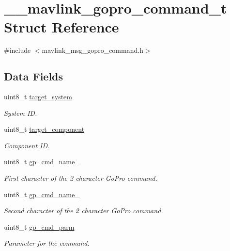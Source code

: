 \hypertarget{struct____mavlink__gopro__command__t}{\section{\+\_\+\+\_\+mavlink\+\_\+gopro\+\_\+command\+\_\+t Struct Reference}
\label{struct____mavlink__gopro__command__t}
}


{\ttfamily \#include $<$mavlink\+\_\+msg\+\_\+gopro\+\_\+command.\+h$>$}

\subsection*{Data Fields}
\begin{DoxyCompactItemize}
\item 
uint8\+\_\+t \hyperlink{struct____mavlink__gopro__command__t_a4c14b6850bc265e04586ea2a2fa1a2ff}{target\+\_\+system}
\begin{DoxyCompactList}\small\item\em System I\+D. \end{DoxyCompactList}\item 
uint8\+\_\+t \hyperlink{struct____mavlink__gopro__command__t_a701c31ece8efb655227348e9d9a1a6e6}{target\+\_\+component}
\begin{DoxyCompactList}\small\item\em Component I\+D. \end{DoxyCompactList}\item 
uint8\+\_\+t \hyperlink{struct____mavlink__gopro__command__t_ae78d6f12c2135e58504b07d2dc89bb77}{gp\+\_\+cmd\+\_\+name\+\_}
\begin{DoxyCompactList}\small\item\em First character of the 2 character Go\+Pro command. \end{DoxyCompactList}\item 
uint8\+\_\+t \hyperlink{struct____mavlink__gopro__command__t_a224349093f3d974d652bed107c473f78}{gp\+\_\+cmd\+\_\+name\+\_}
\begin{DoxyCompactList}\small\item\em Second character of the 2 character Go\+Pro command. \end{DoxyCompactList}\item 
uint8\+\_\+t \hyperlink{struct____mavlink__gopro__command__t_a945de5d0130eafaccc3eff5806fc27f1}{gp\+\_\+cmd\+\_\+parm}
\begin{DoxyCompactList}\small\item\em Parameter for the command. \end{DoxyCompactList}\end{DoxyCompactItemize}


